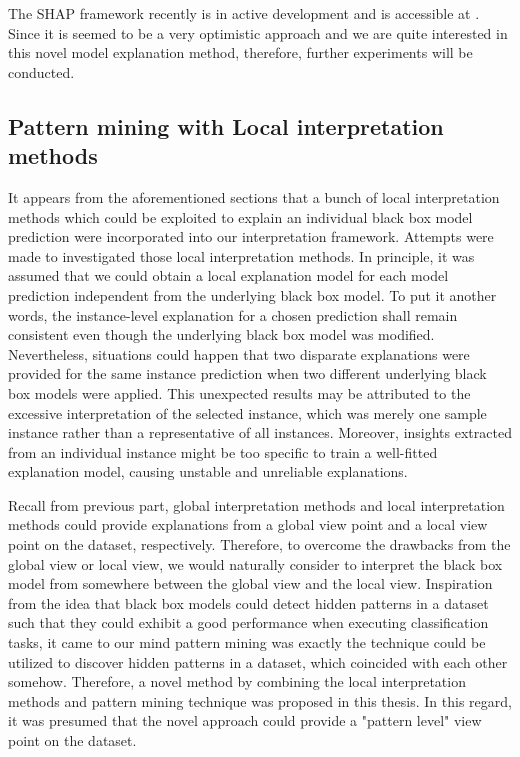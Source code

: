 The SHAP framework recently is in active development and is accessible at \cite{shap}. Since it is seemed to be a very optimistic approach and we are quite interested in this novel model explanation method, therefore, further experiments will be conducted. 


\subsection{Pattern mining with Local interpretation methods}

It appears from the aforementioned sections that a bunch of local interpretation methods which could be exploited to explain an individual black box model prediction were incorporated into our interpretation framework. Attempts were made to investigated those local interpretation methods. In principle, it was assumed that we could obtain a local explanation model for each model prediction independent from the underlying black box model. To put it another words, the instance-level explanation for a chosen prediction shall remain consistent even though the underlying black box model was modified. Nevertheless, situations could happen that two disparate explanations were provided for the same instance prediction when two different underlying black box models were applied. This unexpected results may be attributed to the excessive interpretation of the selected instance, which was merely one sample instance rather than a representative of all instances. Moreover, insights extracted from an individual instance might be too specific to train a well-fitted explanation model, causing unstable and unreliable explanations. 

Recall from previous part, global interpretation methods and local interpretation methods could provide explanations from a global view point and a local view point on the dataset, respectively. Therefore, to overcome the drawbacks from the global view or local view, we would naturally consider to interpret the black box model from somewhere between the global view and the local view. Inspiration from the idea that black box models could detect hidden patterns in a dataset such that they could exhibit a good performance when executing classification tasks, it came to our mind pattern mining was exactly the technique could be utilized to discover hidden patterns in a dataset, which coincided with each other somehow. Therefore, a novel method by combining the local interpretation methods and pattern mining technique was proposed in this thesis. In this regard, it was presumed that the novel approach could provide a "pattern level" view point on the dataset. 

